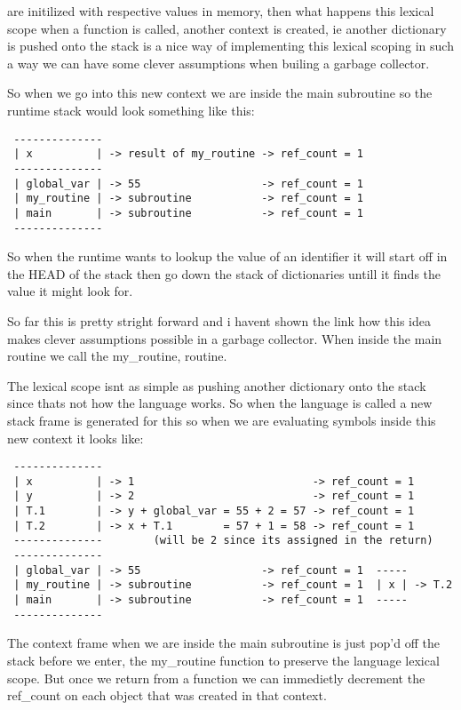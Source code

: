 \documentclass[defaultstyle,11pt]{article}
\begin{document}
are initilized with respective values in memory, then what
happens this lexical scope when a function is called, another context is created, ie another dictionary
is pushed onto the stack is a nice way of implementing this lexical scoping in such a way we can have 
some clever assumptions when builing a garbage collector.

So when we go into this new context we are inside the main subroutine so the runtime stack would look
something like this:

\begin{lstlisting}
 --------------
 | x          | -> result of my_routine -> ref_count = 1
 --------------
 | global_var | -> 55                   -> ref_count = 1
 | my_routine | -> subroutine           -> ref_count = 1
 | main       | -> subroutine           -> ref_count = 1
 --------------
\end{lstlisting}

So when the runtime wants to lookup the value of an identifier it will start off in the HEAD of the
stack then go down the stack of dictionaries untill it finds the value it might look for.

So far this is pretty stright forward and i havent shown the link how this idea makes clever assumptions
possible in a garbage collector. When inside the main routine we call the my\_routine, routine.

The lexical scope isnt as simple as pushing another dictionary onto the stack since thats not how the
language works. So when the language is called a new stack frame is generated for this so when we are
evaluating symbols inside this new context it looks like:

\begin{lstlisting}
 --------------
 | x          | -> 1                            -> ref_count = 1
 | y          | -> 2                            -> ref_count = 1
 | T.1        | -> y + global_var = 55 + 2 = 57 -> ref_count = 1
 | T.2        | -> x + T.1        = 57 + 1 = 58 -> ref_count = 1 
 --------------        (will be 2 since its assigned in the return)
 --------------
 | global_var | -> 55                   -> ref_count = 1  -----
 | my_routine | -> subroutine           -> ref_count = 1  | x | -> T.2  
 | main       | -> subroutine           -> ref_count = 1  -----   
 --------------
\end{lstlisting}

The context frame when we are inside the main subroutine is just pop'd off the stack before we enter,
the my\_routine function to preserve the language lexical scope. But once we return from a function we
can immedietly decrement the ref\_count on each object that was created in that context.
\end{document}
